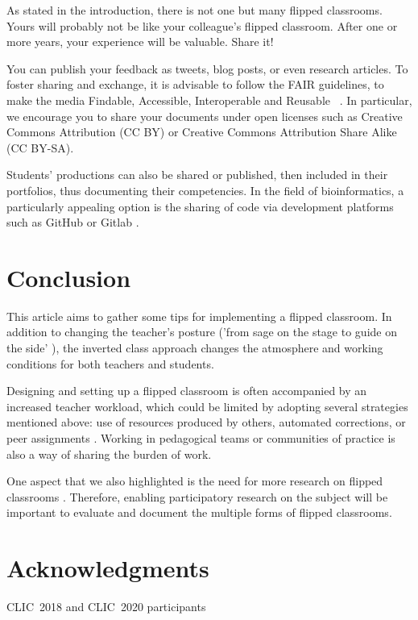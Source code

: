\documentclass[10pt,letterpaper]{article}
\begin{document}
As stated in the introduction, there is not one but many flipped classrooms. Yours will probably not be like your colleague's flipped
classroom. After one or more years, your experience will be valuable. Share it!

You can publish your feedback as tweets, blog posts, or even research articles. To foster sharing and exchange, it is advisable to follow the FAIR guidelines, to make the media Findable, Accessible, Interoperable and Reusable ~\cite{garcia2020ten}. In particular, we encourage you to share your documents under open licenses such as Creative Commons Attribution (CC BY) or Creative Commons Attribution Share Alike (CC BY-SA).

Students’ productions can also be shared or published, then included in their portfolios, thus documenting their competencies. 
In the field of bioinformatics, a particularly appealing option is the sharing of code via development platforms such as GitHub or Gitlab \cite{blischak_quick_2016,abdollahi2018meet}.


\section*{Conclusion}

This article aims to gather some tips for implementing a flipped classroom. In addition to changing the teacher's posture ('from sage on the stage to guide on the side' \cite{king_sage_1993}), the inverted class approach changes the atmosphere and working conditions for both teachers and students.

Designing and setting up a flipped classroom is often accompanied by an increased teacher workload, which could be limited by adopting several strategies mentioned above: use of resources produced by others, automated corrections, or peer assignments \cite{guilbault_classe_2017}. Working in pedagogical teams or communities of practice is also a way of sharing the burden of work.

One aspect that we also highlighted is the need for more research on flipped classrooms \cite{hew_does_2020}. 
Therefore, enabling participatory research on the subject will be important to evaluate and document the multiple forms of flipped classrooms.


\section*{Acknowledgments}
{CLIC~2018 and CLIC~2020 participants}

\nolinenumbers

%
%
% 


\end{document}
